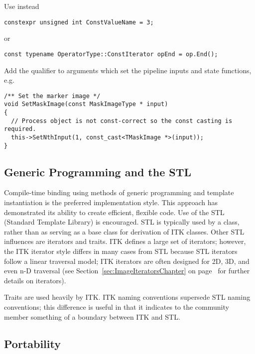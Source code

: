 Use instead

\small
\begin{verbatim}
constexpr unsigned int ConstValueName = 3;
\end{verbatim}
\normalsize

or

\small
\begin{verbatim}
const typename OperatorType::ConstIterator opEnd = op.End();
\end{verbatim}
\normalsize

Add the  qualifier to arguments which set the pipeline inputs and
state functions, e.g.
\small
\begin{verbatim}
/** Set the marker image */
void SetMaskImage(const MaskImageType * input)
{
  // Process object is not const-correct so the const casting is required.
  this->SetNthInput(1, const_cast<TMaskImage *>(input));
}
\end{verbatim}
\normalsize


\subsection{Generic Programming and the STL}
\label{subsec:GenericProgrammingAndSTL}

Compile-time binding using methods of generic programming and template
instantiation is the preferred implementation style. This approach has
demonstrated its ability to create efficient, flexible code. Use of the STL
(Standard Template Library) is encouraged. STL is typically used by a class,
rather than as serving as a base class for derivation of ITK classes. Other
STL influences are iterators and traits. ITK defines a large set of iterators;
however, the ITK iterator style differs in many cases from STL because STL
iterators follow a linear traversal model; ITK iterators are often designed for
2D, 3D, and even n-D traversal (see Section~\ref{sec:ImageIteratorsChapter} on
page~\pageref{sec:ImageIteratorsChapter} for further details on iterators).

Traits are used heavily by ITK. ITK naming conventions supersede STL naming
conventions; this difference is useful in that it indicates to the community
member something of a boundary between ITK and STL.


\subsection{Portability}
\label{subsec:Portability}

